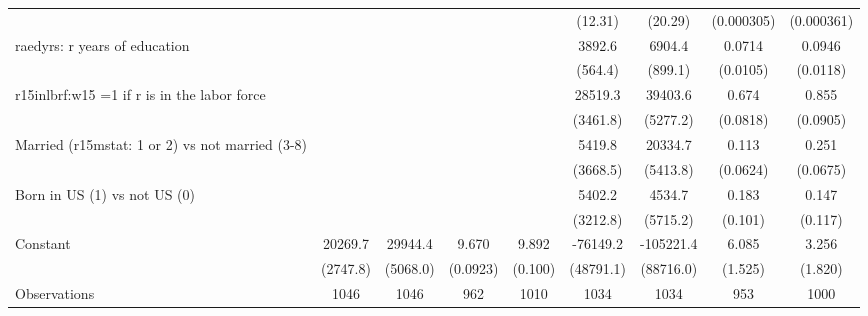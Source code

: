 \begin{table}[htbp]
\begin{tabular}{l*{8}{c}}
                &                  &                  &                  &                  &  (12.31)         &  (20.29)         &(0.000305)         &(0.000361)         \\
\addlinespace
raedyrs: r years of education&                  &                  &                  &                  &   3892.6\sym{***}&   6904.4\sym{***}&   0.0714\sym{***}&   0.0946\sym{***}\\
                &                  &                  &                  &                  &  (564.4)         &  (899.1)         & (0.0105)         & (0.0118)         \\
\addlinespace
r15inlbrf:w15 =1 if r is in the labor force&                  &                  &                  &                  &  28519.3\sym{***}&  39403.6\sym{***}&    0.674\sym{***}&    0.855\sym{***}\\
                &                  &                  &                  &                  & (3461.8)         & (5277.2)         & (0.0818)         & (0.0905)         \\
\addlinespace
Married (r15mstat: 1 or 2) vs not married (3-8)&                  &                  &                  &                  &   5419.8         &  20334.7\sym{***}&    0.113\sym{*}  &    0.251\sym{***}\\
                &                  &                  &                  &                  & (3668.5)         & (5413.8)         & (0.0624)         & (0.0675)         \\
\addlinespace
Born in US (1) vs not US (0)&                  &                  &                  &                  &   5402.2\sym{*}  &   4534.7         &    0.183\sym{*}  &    0.147         \\
                &                  &                  &                  &                  & (3212.8)         & (5715.2)         &  (0.101)         &  (0.117)         \\
\addlinespace
Constant        &  20269.7\sym{***}&  29944.4\sym{***}&    9.670\sym{***}&    9.892\sym{***}& -76149.2         &-105221.4         &    6.085\sym{***}&    3.256\sym{*}  \\
                & (2747.8)         & (5068.0)         & (0.0923)         &  (0.100)         &(48791.1)         &(88716.0)         &  (1.525)         &  (1.820)         \\
\midrule
Observations    &     1046         &     1046         &      962         &     1010         &     1034         &     1034         &      953         &     1000         \\

\end{tabular}
\end{table}
